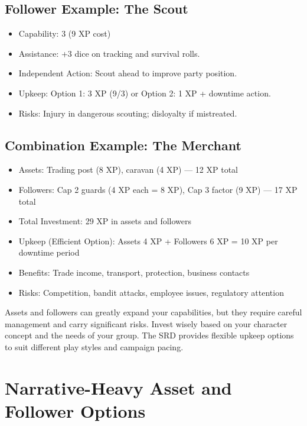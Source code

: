 \documentclass[11pt,twoside,openany]{book}
\begin{document}
\subsection*{Follower Example: The Scout}

\begin{itemize}
\item Capability: 3 (9 XP cost)
\item Assistance: +3 dice on tracking and survival rolls.
\item Independent Action: Scout ahead to improve party position.
\item Upkeep: Option 1: 3 XP (9/3) or Option 2: 1 XP + downtime action.
\item Risks: Injury in dangerous scouting; disloyalty if mistreated.
\end{itemize}

\subsection*{Combination Example: The Merchant}

\begin{itemize}
\item Assets: Trading post (8 XP), caravan (4 XP) — 12 XP total
\item Followers: Cap 2 guards (4 XP each = 8 XP), Cap 3 factor (9 XP) — 17 XP total
\item Total Investment: 29 XP in assets and followers
\item Upkeep (Efficient Option): Assets 4 XP + Followers 6 XP = 10 XP per downtime period
\item Benefits: Trade income, transport, protection, business contacts
\item Risks: Competition, bandit attacks, employee issues, regulatory attention
\end{itemize}

\begin{tcolorbox}[colback=gray!5!white, colframe=gray!75!black, title=Remember, fonttitle=\bfseries]
Assets and followers can greatly expand your capabilities, but they require careful management and carry significant risks. Invest wisely based on your character concept and the needs of your group. The SRD provides flexible upkeep options to suit different play styles and campaign pacing.
\end{tcolorbox}

\section*{Narrative-Heavy Asset and Follower Options} 
\end{document}

